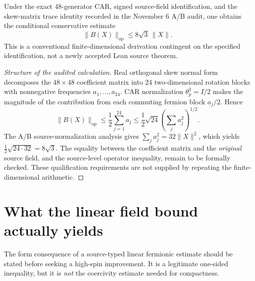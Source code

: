 \begin{proposition}\label{prop:B-analytic}
Under the exact 48-generator CAR, signed source-field identification,
and the skew-matrix trace identity recorded in the November 6 A/B audit,
one obtains the conditional conservative estimate
\begin{equation}\label{eq:analytic-C}
   \|B(X)\|_{\mathrm{op}}\le 8\sqrt3\,\|X\|.
\end{equation}
This is a conventional finite-dimensional derivation contingent on the
specified identification, not a newly accepted Lean source theorem.
\end{proposition}
\begin{proof}[Structure of the audited calculation]
Real orthogonal skew normal form decomposes the \(48\times48\) coefficient
matrix into 24 two-dimensional rotation blocks with nonnegative
frequencies \(a_1,\ldots,a_{24}\). CAR normalization
\(\theta_p^2=I/2\) makes the magnitude of the contribution from each
commuting fermion block \(a_j/2\). Hence
\begin{equation}\label{eq:B-HS-bound}
  \|B(X)\|_{\mathrm{op}}
  \le \frac12\sum_{j=1}^{24}a_j
  \le\frac12\sqrt{24}\left(\sum_j a_j^2\right)^{1/2}.
\end{equation}
The A/B source-normalization analysis gives
\(\sum_j a_j^2=32\|X\|^2\), which yields
\(\frac12\sqrt{24\cdot32}=8\sqrt3\).
The equality between the coefficient matrix and the \emph{original}
source field, and the source-level operator inequality, remain to be
formally checked. These qualification requirements are not supplied by
repeating the finite-dimensional arithmetic.
\end{proof}

\section{What the linear field bound actually yields}
The form consequence of a source-typed linear fermionic estimate should
be stated before seeking a high-spin improvement. It is a legitimate
one-sided inequality, but it is \emph{not} the coercivity estimate
needed for compactness.

